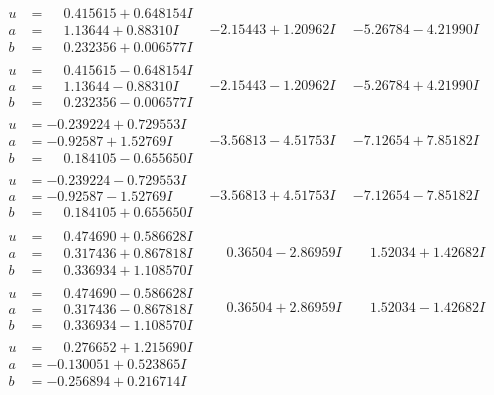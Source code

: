 \documentclass[1p]{elsarticle_modified}
\theoremstyle{definition}
\begin{document}
$$\begin{array}{c|c|c}
\begin{aligned}
u &= \phantom{-}0.415615 + 0.648154 I \\
a &= \phantom{-}1.13644 + 0.88310 I \\
b &= \phantom{-}0.232356 + 0.006577 I\end{aligned}
 & -2.15443 + 1.20962 I & -5.26784 - 4.21990 I \\ \hline\begin{aligned}
u &= \phantom{-}0.415615 - 0.648154 I \\
a &= \phantom{-}1.13644 - 0.88310 I \\
b &= \phantom{-}0.232356 - 0.006577 I\end{aligned}
 & -2.15443 - 1.20962 I & -5.26784 + 4.21990 I \\ \hline\begin{aligned}
u &= -0.239224 + 0.729553 I \\
a &= -0.92587 + 1.52769 I \\
b &= \phantom{-}0.184105 - 0.655650 I\end{aligned}
 & -3.56813 - 4.51753 I & -7.12654 + 7.85182 I \\ \hline\begin{aligned}
u &= -0.239224 - 0.729553 I \\
a &= -0.92587 - 1.52769 I \\
b &= \phantom{-}0.184105 + 0.655650 I\end{aligned}
 & -3.56813 + 4.51753 I & -7.12654 - 7.85182 I \\ \hline\begin{aligned}
u &= \phantom{-}0.474690 + 0.586628 I \\
a &= \phantom{-}0.317436 + 0.867818 I \\
b &= \phantom{-}0.336934 + 1.108570 I\end{aligned}
 & \phantom{-}0.36504 - 2.86959 I & \phantom{-}1.52034 + 1.42682 I \\ \hline\begin{aligned}
u &= \phantom{-}0.474690 - 0.586628 I \\
a &= \phantom{-}0.317436 - 0.867818 I \\
b &= \phantom{-}0.336934 - 1.108570 I\end{aligned}
 & \phantom{-}0.36504 + 2.86959 I & \phantom{-}1.52034 - 1.42682 I \\ \hline\begin{aligned}
u &= \phantom{-}0.276652 + 1.215690 I \\
a &= -0.130051 + 0.523865 I \\
b &= -0.256894 + 0.216714 I\end{aligned}

\end{array}$$
\end{document}

